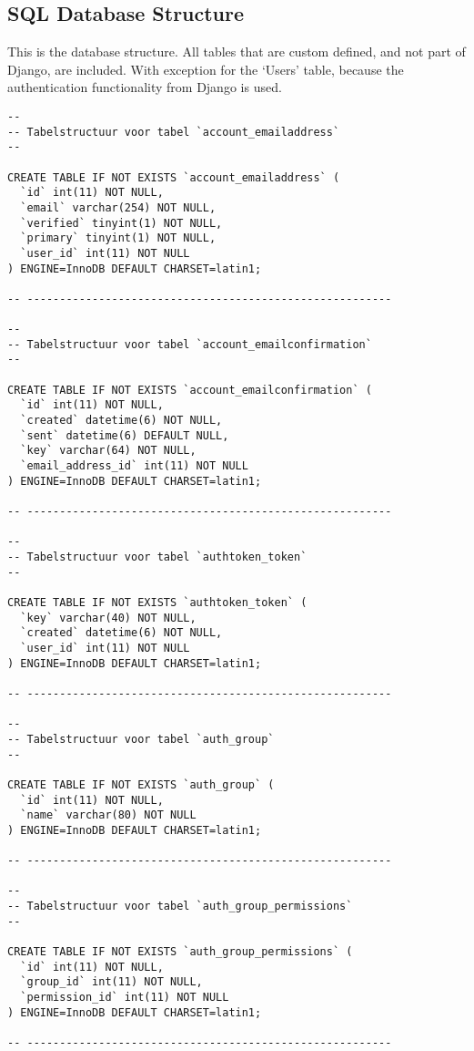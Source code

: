 \documentclass[11pt]{article}
\begin{document}
\subsection{SQL Database Structure}
This is the database structure. All tables that are custom defined, and not part of Django, are included. With exception for the `Users' table, because the authentication functionality from Django is used.
\begin{lstlisting}[style=SQL]
--
-- Tabelstructuur voor tabel `account_emailaddress`
--

CREATE TABLE IF NOT EXISTS `account_emailaddress` (
  `id` int(11) NOT NULL,
  `email` varchar(254) NOT NULL,
  `verified` tinyint(1) NOT NULL,
  `primary` tinyint(1) NOT NULL,
  `user_id` int(11) NOT NULL
) ENGINE=InnoDB DEFAULT CHARSET=latin1;

-- --------------------------------------------------------

--
-- Tabelstructuur voor tabel `account_emailconfirmation`
--

CREATE TABLE IF NOT EXISTS `account_emailconfirmation` (
  `id` int(11) NOT NULL,
  `created` datetime(6) NOT NULL,
  `sent` datetime(6) DEFAULT NULL,
  `key` varchar(64) NOT NULL,
  `email_address_id` int(11) NOT NULL
) ENGINE=InnoDB DEFAULT CHARSET=latin1;

-- --------------------------------------------------------

--
-- Tabelstructuur voor tabel `authtoken_token`
--

CREATE TABLE IF NOT EXISTS `authtoken_token` (
  `key` varchar(40) NOT NULL,
  `created` datetime(6) NOT NULL,
  `user_id` int(11) NOT NULL
) ENGINE=InnoDB DEFAULT CHARSET=latin1;

-- --------------------------------------------------------

--
-- Tabelstructuur voor tabel `auth_group`
--

CREATE TABLE IF NOT EXISTS `auth_group` (
  `id` int(11) NOT NULL,
  `name` varchar(80) NOT NULL
) ENGINE=InnoDB DEFAULT CHARSET=latin1;

-- --------------------------------------------------------

--
-- Tabelstructuur voor tabel `auth_group_permissions`
--

CREATE TABLE IF NOT EXISTS `auth_group_permissions` (
  `id` int(11) NOT NULL,
  `group_id` int(11) NOT NULL,
  `permission_id` int(11) NOT NULL
) ENGINE=InnoDB DEFAULT CHARSET=latin1;

-- --------------------------------------------------------


\end{lstlisting}
\end{document}
